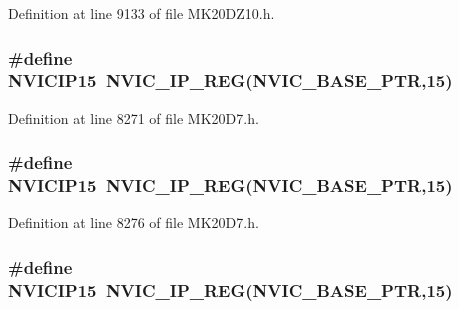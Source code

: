 Definition at line 9133 of file M\+K20\+D\+Z10.\+h.

\subsubsection[{\texorpdfstring{N\+V\+I\+C\+I\+P15}{NVICIP15}}]{\setlength{\rightskip}{0pt plus 5cm}\#define N\+V\+I\+C\+I\+P15~{\bf N\+V\+I\+C\+\_\+\+I\+P\+\_\+\+R\+EG}({\bf N\+V\+I\+C\+\_\+\+B\+A\+S\+E\+\_\+\+P\+TR},15)}\hypertarget{group___n_v_i_c___register___accessor___macros_ga56d53fe7c577134c8fa21fd8835e1892}{}\label{group___n_v_i_c___register___accessor___macros_ga56d53fe7c577134c8fa21fd8835e1892}


Definition at line 8271 of file M\+K20\+D7.\+h.

\subsubsection[{\texorpdfstring{N\+V\+I\+C\+I\+P15}{NVICIP15}}]{\setlength{\rightskip}{0pt plus 5cm}\#define N\+V\+I\+C\+I\+P15~{\bf N\+V\+I\+C\+\_\+\+I\+P\+\_\+\+R\+EG}({\bf N\+V\+I\+C\+\_\+\+B\+A\+S\+E\+\_\+\+P\+TR},15)}\hypertarget{group___n_v_i_c___register___accessor___macros_ga56d53fe7c577134c8fa21fd8835e1892}{}\label{group___n_v_i_c___register___accessor___macros_ga56d53fe7c577134c8fa21fd8835e1892}


Definition at line 8276 of file M\+K20\+D7.\+h.

\subsubsection[{\texorpdfstring{N\+V\+I\+C\+I\+P15}{NVICIP15}}]{\setlength{\rightskip}{0pt plus 5cm}\#define N\+V\+I\+C\+I\+P15~{\bf N\+V\+I\+C\+\_\+\+I\+P\+\_\+\+R\+EG}({\bf N\+V\+I\+C\+\_\+\+B\+A\+S\+E\+\_\+\+P\+TR},15)}\hypertarget{group___n_v_i_c___register___accessor___macros_ga56d53fe7c577134c8fa21fd8835e1892}{}\label{group___n_v_i_c___register___accessor___macros_ga56d53fe7c577134c8fa21fd8835e1892}


